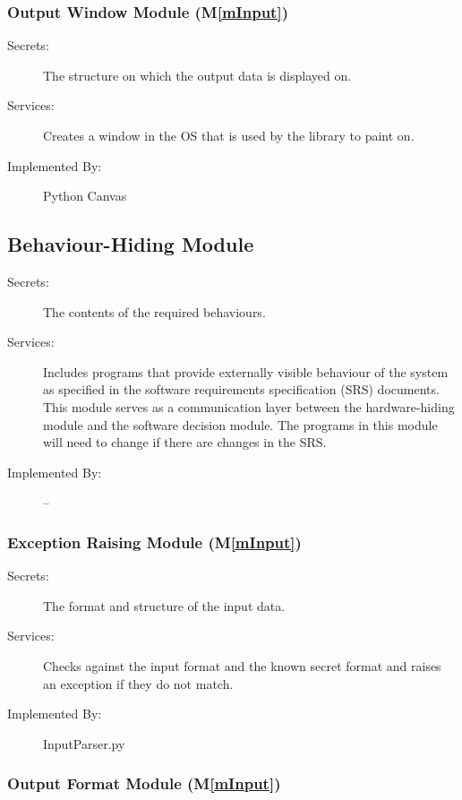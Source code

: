 \documentclass[12pt, titlepage]{article}
\newcommand{\mref}[1]{M\ref{#1}}
\begin{document}
\subsubsection{Output Window Module (\mref{mInput})}

\begin{description}
\item[Secrets:]The structure on which the output data is displayed on.
\item[Services:]Creates a window in the OS that is used by the library to paint on. 
\item[Implemented By:] Python Canvas
\end{description}

\subsection{Behaviour-Hiding Module}

\begin{description}
\item[Secrets:]The contents of the required behaviours.
\item[Services:]Includes programs that provide externally visible behaviour of
  the system as specified in the software requirements specification (SRS)
  documents. This module serves as a communication layer between the
  hardware-hiding module and the software decision module. The programs in this
  module will need to change if there are changes in the SRS.
\item[Implemented By:] --
\end{description}

\subsubsection{Exception Raising Module (\mref{mInput})}

\begin{description}
\item[Secrets:] The format and structure of the input data.
\item[Services:] Checks against the input format and the known secret format and raises an exception if they do not match.
\item[Implemented By:] InputParser.py
\end{description}

\subsubsection{Output Format Module (\mref{mInput})}
\end{document}
